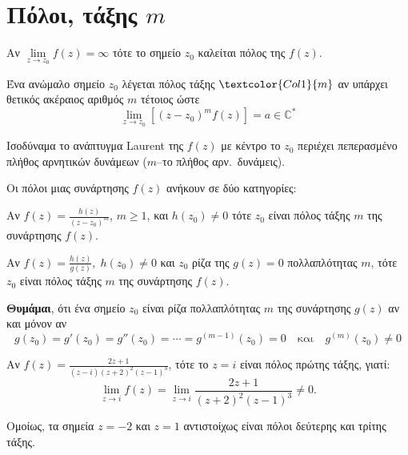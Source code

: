 \section*{Πόλοι, τάξης \ensuremath{ m }}

\begin{dfn} 
  Αν $\lim\limits_{z\to z_0}f(z)=\infty$ τότε το σημείο $z_0$ καλείται 
  \textcolor{Col1}{πόλος} της $f(z)$. 
\end{dfn}

\begin{dfn}
  Ένα ανώμαλο σημείο $z_0$ λέγεται \textcolor{Col1}{πόλος τάξης} 
  $\textcolor{Col1}{m}$ αν υπάρχει θετικός ακέραιος αριθμός $m$ τέτοιος ώστε 
  \[
    \lim\limits_{z\to z_0}\left[(z-z_0)^mf(z)\right]=a \in \mathbb{C}^{*}
  \]
  \begin{myitemize}
    \item Ισοδύναμα το ανάπτυγμα \textlatin{Laurent} της $f(z)$ \textcolor{Col2}{με κέντρο το $z_0$} 
      περιέχει πεπερασμένο πλήθος αρνητικών δυνάμεων ($m$--το πλήθος αρν.\ δυνάμεις). 
  \end{myitemize}
\end{dfn}

\begin{rem}
  Οι πόλοι μιας συνάρτησης $ f(z) $ ανήκουν σε δύο κατηγορίες:
  \begin{myitemize}
    \item Αν $ f(z) = \frac{h(z)}{(z-z_{0})^{m}}$, $m \geq 1 $, και $ h(z_{0}) \neq 0 $ 
      τότε $ z_{0} $ είναι πόλος τάξης $ m $ της συνάρτησης $f(z)$.
    \item Αν $ f(z) = \frac{h(z)}{g(z)}, \; h(z_{0}) \neq 0 $ και $ z_{0} $ ρίζα της 
      $ g(z) = 0 $ πολλαπλότητας $ m $, τότε $ z_{0} $ είναι πόλος τάξης $ m
      $ της συνάρτησης $f(z)$.
  \end{myitemize}
\end{rem}

\begin{rem}
  \textbf{Θυμάμαι}, ότι ένα σημείο $ z_{0} $ είναι ρίζα \textcolor{Col1}{πολλαπλότητας 
  $ m $} της συνάρτησης $ g(z) $ αν και μόνον αν 
  \[
    g(z_{0}) = g'(z_{0}) = g''(z_{0}) = \cdots = g^{(m-1)}(z_{0}) = 0 \quad \text{και} 
    \quad g^{(m)}(z_{0}) \neq 0 
  \] 
\end{rem}

\begin{example}
  Αν $f(z)=\frac{2z+1}{(z-i)(z+2)^2(z-1)^3}$, τότε το $z=i$ είναι πόλος πρώτης τάξης, 
  γιατί: 
  \[
    \lim\limits_{z\to i}f(z)=\lim\limits_{z\to i}\frac{2z+1}{(z+2)^2(z-1)^3}\neq 0.
  \]

  Ομοίως, τα σημεία $z=-2$ και $z=1$ αντιστοίχως είναι πόλοι δεύτερης και τρίτης τάξης.
\end{example}

